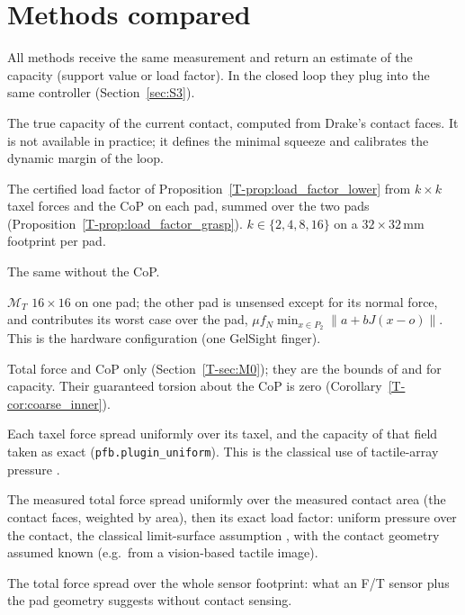 \documentclass[11pt,a4paper]{article}
\newcommand{\M}{\mathcal M}
\newcommand{\T}[1]{\ref{T-#1}}                       %
\newcommand{\code}[1]{\texttt{#1}}
\begin{document}
\section{Methods compared}
\label{sec:methods}

All methods receive the same measurement and return an estimate of the capacity (support value or load factor). In the closed loop they plug
into the same controller (Section~\ref{sec:S3}).

\begin{description}[style=nextline,leftmargin=1.2em]
    \item[Oracle.] The true capacity of the current contact, computed from Drake's contact faces. It is not available in practice; it
    defines the minimal squeeze and calibrates the dynamic margin of the loop.
    \item[Certified $\M_T$ ($k\times k$ taxels).] The certified load factor of Proposition~\T{prop:load_factor_lower} from $k\times k$ taxel forces and
    the CoP on each pad, summed over the two pads (Proposition~\T{prop:load_factor_grasp}). $k\in\{2,4,8,16\}$ on a $32\times32$\,mm footprint per pad.
    \item[Certified $\M_F$ ($16\times16$).] The same without the CoP.
    \item[Certified, one pad sensed.] $\M_T$ $16\times16$ on one pad; the other pad is unsensed except for its normal force, and contributes its
    worst case over the pad, $\mu f_N\min_{x\in P_2}\|a+bJ(x-o)\|$. This is the hardware configuration (one GelSight finger).
    \item[$\M_0$ bounds.] Total force and CoP only (Section~\T{sec:M0}); they are the bounds of \citet{peshkin1988motion} and \citet{huang2017exact}
    for capacity. Their guaranteed torsion about the CoP is zero (Corollary~\T{cor:coarse_inner}).
    \item[Plug-in ($k\times k$).] Each taxel force spread uniformly over its taxel, and the capacity of that field taken as exact
    (\code{pfb.plugin\_uniform}). This is the classical use of tactile-array pressure \citep{bicchi1988integrated,howe1996practical}.
    \item[F/T + contact mask.] The measured total force spread uniformly over the measured contact area (the contact faces, weighted by area),
    then its exact load factor: uniform pressure over the contact, the classical limit-surface assumption \citep{howe1996practical}, with
    the contact geometry assumed known (e.g.\ from a vision-based tactile image).
    \item[Uniform over the pad (F/T only).] The total force spread over the whole sensor footprint: what an F/T sensor plus the pad geometry
    suggests without contact sensing.
\end{description}
\end{document}

